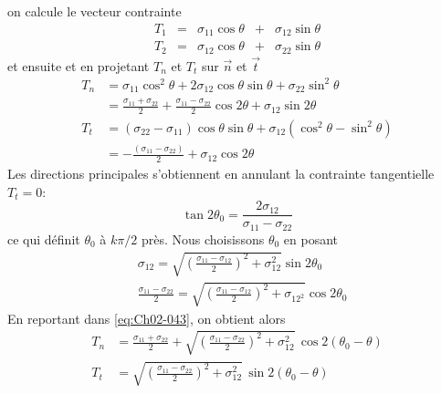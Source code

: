 on calcule le vecteur contrainte
\begin{equation}
    \begin{array}{lllll}
        T_1 & = &\sigma_{11} \cos \theta & +& \sigma_{12} \sin \theta\\
        T_2 & = &\sigma_{12} \cos \theta & + &\sigma_{22} \sin \theta
    \end{array}
    \label{eq:Ch02-040}
\end{equation}
et ensuite et en projetant $T_n$ et $T_t$ sur $\vec{n}$ et $\vec{t}$
\begin{equation}
    \begin{aligned}
        T_n &= \sigma_{11} \cos^2 \theta + 2 \sigma_{12} \cos \theta \sin \theta + \sigma_{22} \sin^2 \theta\\
            &= \frac{\sigma_{11} + \sigma_{22}}{2} + \frac{\sigma_{11} - \sigma_{22}}{2} \cos 2 \theta + \sigma_{12} \sin 2 \theta\\
        T_t &= \left(\sigma_{22}-\sigma_{11}\right) \cos \theta \sin \theta + \sigma_{12} \left( \cos^2\theta -\sin^2 \theta \right)\\
            &= -\frac{\left(\sigma_{11}-\sigma_{22}\right)}{2} + \sigma_{12} \cos 2 \theta
    \end{aligned}
    \label{eq:Ch02-041}
\end{equation}
Les directions principales s'obtiennent en annulant la contrainte tangentielle $T_t = 0$:
\begin{equation}
    \tan 2 \theta_0 = \frac{2\sigma_{12}}{\sigma_{11} - \sigma_{22}}
    \label{eq:Ch02-042}
\end{equation}
ce qui définit $\theta_0$ à $k\pi/2$ près.
Nous choisissons $\theta_0$ en posant 
\begin{equation}
    \begin{aligned}
        &\sigma_{12} = \sqrt{\left( \frac{\sigma_{11} - \sigma_{12}}{2} \right)^2 + \sigma_{12}^2} \sin 2 \theta_0 \\
       & \frac{\sigma_{11} - \sigma_{22}}{2} = \sqrt{\left( \frac{\sigma_{11} - \sigma_{12}}{2} \right)^2 + \sigma_{12^2}} \cos 2 \theta_0
    \end{aligned}
    \label{eq:Ch02-043}
\end{equation}
En reportant dans \eqref{eq:Ch02-043}, on obtient alors 
\begin{equation}
    \begin{aligned}
        T_n &= \frac{\sigma_{11} + \sigma_{22}}{2} + \sqrt{\left( \frac{\sigma_{11} - \sigma_{22}}{2} \right)^2 + \sigma_{12}^2}\, \cos 2 \left( \theta_0 - \theta \right)\\
        T_t &= \sqrt{\left( \frac{\sigma_{11} - \sigma_{22}}{2} \right)^2 + \sigma_{12}^2}\, \sin 2 \left( \theta_0 - \theta \right)
    \end{aligned}
    \label{eq:Ch02-044}
\end{equation}
